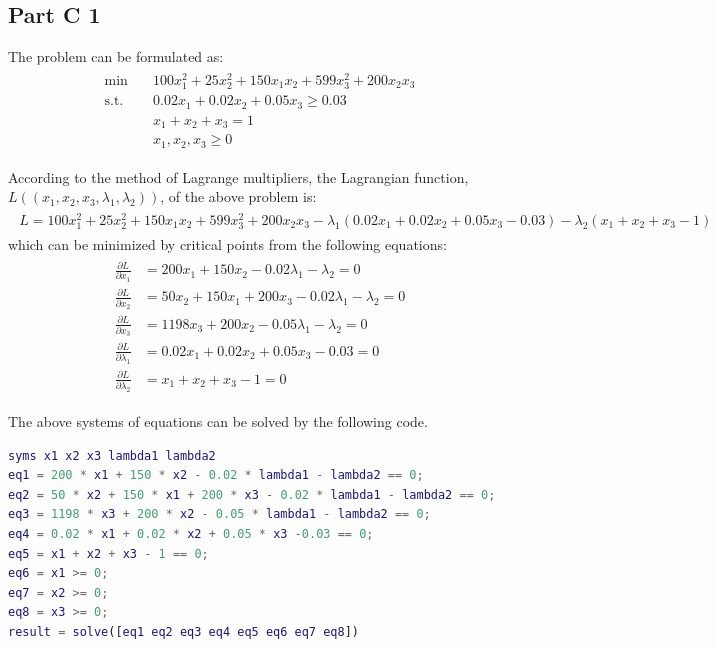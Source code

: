 \documentclass[fleqn,10pt]{wlscirep}
\begin{document}
\subsection{Part C 1}

The problem can be formulated as:
\begin{align} \begin{split}
    \min \quad & 100 x_{1}^2 + 25 x_{2}^2 + 150 x_{1} x_{2} + 599 x_{3}^2 + 200 x_{2} x_{3} \\
    \text{s.t.} \quad & 0.02 x_{1} + 0.02 x_{2} + 0.05 x_{3} \geq 0.03 \\
    & x_{1} + x_{2} + x_{3} = 1 \\
    & x_{1}, x_{2}, x_{3} \geq 0
\end{split} \end{align} 

According to the method of Lagrange multipliers, the Lagrangian function, $L((x_{1}, x_{2}, x_{3}, \lambda_{1}, \lambda_{2}))$, of the above problem is:
\begin{align} \begin{split}
    L = 100 x_{1}^2 + 25 x_{2}^2 + 150 x_{1} x_{2} + 599 x_{3}^2 + 200 x_{2} x_{3} - \lambda_{1} (0.02 x_{1} + 0.02 x_{2} + 0.05 x_{3} - 0.03) - \lambda_{2} (x_{1} + x_{2} + x_{3} - 1)
\end{split} \end{align} 
which can be minimized by critical points from the following equations:
\begin{align} \begin{split}
    \frac{\partial L}{\partial x_{1}} &= 200 x_{1} + 150 x_{2} - 0.02 \lambda_{1} - \lambda_{2} = 0 \\
    \frac{\partial L}{\partial x_{2}} &= 50 x_{2} + 150 x_{1} + 200 x_{3} - 0.02 \lambda_{1} - \lambda_{2} = 0 \\
    \frac{\partial L}{\partial x_{3}} &= 1198 x_{3} + 200 x_{2} - 0.05 \lambda_{1} - \lambda_{2} = 0 \\
    \frac{\partial L}{\partial \lambda_{1}} &= 0.02 x_{1} + 0.02 x_{2} + 0.05 x_{3} - 0.03 = 0 \\
    \frac{\partial L}{\partial \lambda_{2}} &= x_{1} + x_{2} + x_{3} - 1 = 0
\end{split} \end{align} 

The above systems of equations can be solved by the following code.

\begin{lstlisting}[language=MATLAB, caption=MATLAB code to solve the equations]
syms x1 x2 x3 lambda1 lambda2
eq1 = 200 * x1 + 150 * x2 - 0.02 * lambda1 - lambda2 == 0;
eq2 = 50 * x2 + 150 * x1 + 200 * x3 - 0.02 * lambda1 - lambda2 == 0;
eq3 = 1198 * x3 + 200 * x2 - 0.05 * lambda1 - lambda2 == 0;
eq4 = 0.02 * x1 + 0.02 * x2 + 0.05 * x3 -0.03 == 0;
eq5 = x1 + x2 + x3 - 1 == 0;
eq6 = x1 >= 0;
eq7 = x2 >= 0;
eq8 = x3 >= 0;
result = solve([eq1 eq2 eq3 eq4 eq5 eq6 eq7 eq8])
\end{lstlisting}
\end{document}
